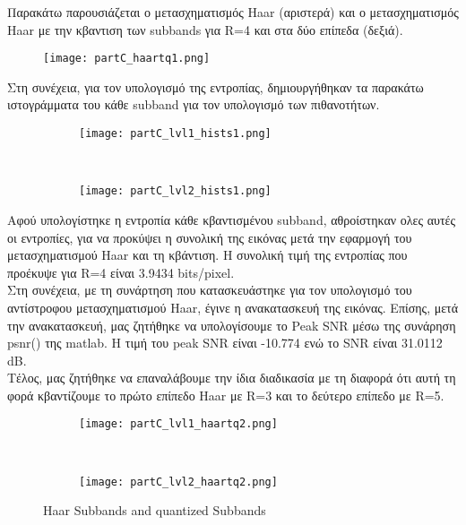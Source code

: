 \documentclass{article}
\begin{document}
	\noindent
	Παρακάτω παρουσιάζεται ο μετασχηματισμός Haar (αριστερά) και ο μετασχηματισμός Haar με την κβαντιση των subbands για R=4 και στα δύο επίπεδα (δεξιά).
	
	\begin{figure}[h!]
		\centering
		\texttt{[image: partC\_haartq1.png]}
	\end{figure}

	\pagebreak
	\noindent
	Στη συνέχεια, για τον υπολογισμό της εντροπίας, δημιουργήθηκαν τα παρακάτω ιστογράμματα του κάθε subband για τον υπολογισμό των πιθανοτήτων.
	
	\begin{figure}[h!]
		\centering
		\begin{subfigure}[t]{0.5\textwidth}
			\centering
			\texttt{[image: partC\_lvl1\_hists1.png]}
		\end{subfigure}%
		~
		\begin{subfigure}[t]{0.5\textwidth}
			\centering
			\texttt{[image: partC\_lvl2\_hists1.png]}
		\end{subfigure}
	\end{figure}

	\noindent
	Αφού υπολογίστηκε η εντροπία κάθε κβαντισμένου subband, αθροίστηκαν ολες αυτές οι εντροπίες, για να προκύψει η συνολική της εικόνας μετά την εφαρμογή του μετασχηματισμού Haar και τη κβάντιση. Η συνολική τιμή της εντροπίας που προέκυψε για R=4 είναι 3.9434 bits/pixel.\\
	
	\noindent
	Στη συνέχεια, με τη συνάρτηση που κατασκευάστηκε για τον υπολογισμό του αντίστροφου μετασχηματισμού Haar, έγινε η ανακατασκευή της εικόνας. Επίσης, μετά την ανακατασκευή, μας ζητήθηκε να υπολογίσουμε το Peak SNR μέσω της συνάρηση psnr() της matlab. H τιμή του peak SNR είναι -10.774 ενώ το SNR είναι 31.0112 dB.\\
	
	\noindent
	Τέλος, μας ζητήθηκε να επαναλάβουμε την ίδια διαδικασία με τη διαφορά ότι αυτή τη φορά κβαντίζουμε το πρώτο επίπεδο Haar με R=3 και το δεύτερο επίπεδο με R=5.
	
	\begin{figure}[h!]
		\centering
		\begin{subfigure}[t]{0.5\textwidth}
			\centering
			\texttt{[image: partC\_lvl1\_haartq2.png]}
		\end{subfigure}%
		~
		\begin{subfigure}[t]{0.5\textwidth}
			\centering
			\texttt{[image: partC\_lvl2\_haartq2.png]}
		\end{subfigure}
		\caption{Haar Subbands and quantized Subbands}
	\end{figure}	
\end{document}
